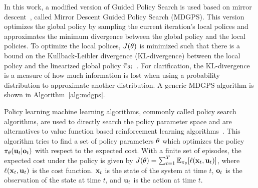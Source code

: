 In this work, a modified version of Guided Policy Search is used based on mirror descent~\cite{ml-gpsam-16}, called Mirror Descent Guided Policy Search (MDGPS).
This version optimizes the global policy by sampling the current iteration's local polices and approximates the minimum divergence between the global policy and the local policies.
To optimize the local polices, $J(\theta)$ is minimized such that there is a bound on the Kullback-Leibler divergence (KL-divergence) between the local policy and the linearized global policy $\bar{\pi}_{\theta{i}}$~\cite{bagnell2003covariant,ps-rlmsp-08,pma-reps-10,slmja-trpo-15}.
For clarification, the KL-divergence is a measure of how much information is lost when using a probability distribution to approximate another distribution.
A generic MDGPS algorithm is shown in Algorithm~\ref{alg:mdgps}.

Policy learning machine learning algorithms, commonly called policy search algorithms, are used to directly search the policy parameter space and are alternatives to value function based reinforcement learning algorithms~\cite{bagnell2003policy}. 
This algorithm tries to find a set of
policy parameters $\theta$ which optimizes the policy
$\pi_{\theta}(\mathbf{u}_t|\mathbf{o}_t)$ with respect to the expected cost. 
With a finite set of episodes, 
the expected cost under the policy is given by
$J(\theta)=\sum_{t=1}^{T}\mathbb{E}_{\pi_{\theta}}[\ell(\mathbf{x}_t,\mathbf{u}_t)]$,
where $\ell(\mathbf{x}_t,\mathbf{u}_t)$ is the cost function. 
$\mathbf{x}_t$ is the state of the
system at time $t$, $\mathbf{o}_t$ is the observation of the state at time $t$,
and $\mathbf{u}_t$ is the action at time $t$.



